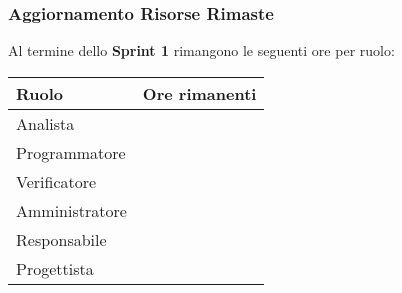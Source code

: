\subsubsection{Aggiornamento Risorse Rimaste}
Al termine dello \textbf{Sprint 1} rimangono le seguenti ore per ruolo:
\begin{table}[!h]
    \centering
    \begin{tabular}{| l | l |}
    \hline
        Ruolo & Ore rimanenti\\
    \hline
        Analista & \\
    \hline
        Programmatore & \\
    \hline
        Verificatore & \\
    \hline
        Amministratore & \\
    \hline
        Responsabile & \\
    \hline
        Progettista & \\
    \hline
    \end{tabular}
\end{table}